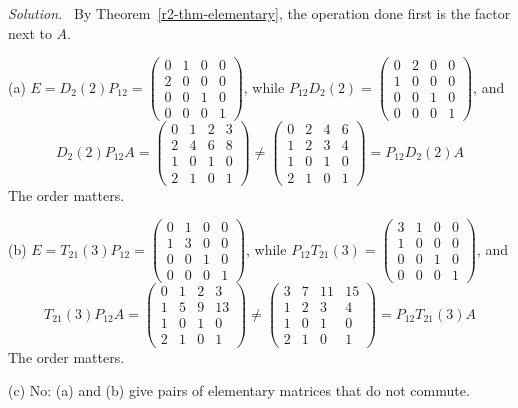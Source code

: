 \documentclass[12pt]{article}
\theoremstyle{definition}
\newenvironment{solution}{\par\noindent\textit{Solution.}\ }{\par\smallskip}
\begin{document}
\begin{solution}
By Theorem~\ref{r2-thm-elementary}, the operation done first is the factor next to \(A\).

(a) \(E=D_2(2)P_{12}=\left(\begin{smallmatrix}0&1&0&0\\2&0&0&0\\0&0&1&0\\0&0&0&1\end{smallmatrix}\right)\),
while \(P_{12}D_2(2)=\left(\begin{smallmatrix}0&2&0&0\\1&0&0&0\\0&0&1&0\\0&0&0&1\end{smallmatrix}\right)\), and
\[
D_2(2)P_{12}A=\begin{pmatrix}0&1&2&3\\2&4&6&8\\1&0&1&0\\2&1&0&1\end{pmatrix}
\ne\begin{pmatrix}0&2&4&6\\1&2&3&4\\1&0&1&0\\2&1&0&1\end{pmatrix}=P_{12}D_2(2)A
\]
The order matters.

(b) \(E=T_{21}(3)P_{12}=\left(\begin{smallmatrix}0&1&0&0\\1&3&0&0\\0&0&1&0\\0&0&0&1\end{smallmatrix}\right)\),
while \(P_{12}T_{21}(3)=\left(\begin{smallmatrix}3&1&0&0\\1&0&0&0\\0&0&1&0\\0&0&0&1\end{smallmatrix}\right)\), and
\[
T_{21}(3)P_{12}A=\begin{pmatrix}0&1&2&3\\1&5&9&13\\1&0&1&0\\2&1&0&1\end{pmatrix}
\ne\begin{pmatrix}3&7&11&15\\1&2&3&4\\1&0&1&0\\2&1&0&1\end{pmatrix}=P_{12}T_{21}(3)A
\]
The order matters.

(c) No: (a) and (b) give pairs of elementary matrices that do not commute.
\end{solution}
\end{document}
